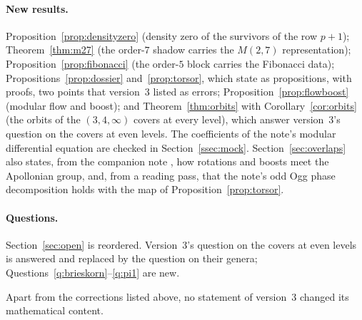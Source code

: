 \paragraph{New results.}
Proposition~\ref{prop:densityzero} (density zero of the survivors of the row $p+1$); Theorem~\ref{thm:m27} (the order-$7$ shadow carries the $M(2,7)$ representation); Proposition~\ref{prop:fibonacci} (the order-$5$ block carries the Fibonacci data); Propositions~\ref{prop:dossier} and~\ref{prop:torsor}, which state as propositions, with proofs, two points that version~3 listed as errors; Proposition~\ref{prop:flowboost} (modular flow and boost); and Theorem~\ref{thm:orbits} with Corollary~\ref{cor:orbits} (the orbits of the $(3,4,\infty)$ covers at every level), which answer version~3's question on the covers at even levels. The coefficients of the note's modular differential equation are checked in Section~\ref{ssec:mock}. Section~\ref{sec:overlaps} also states, from the companion note \cite{ApollonianNote}, how rotations and boosts meet the Apollonian group, and, from a reading pass, that the note's odd Ogg phase decomposition holds with the map of Proposition~\ref{prop:torsor}.

\paragraph{Questions.}
Section~\ref{sec:open} is reordered. Version~3's question on the covers at even levels is answered and replaced by the question on their genera; Questions~\ref{q:brieskorn}--\ref{q:pi1} are new.

Apart from the corrections listed above, no statement of version~3 changed its mathematical content.
